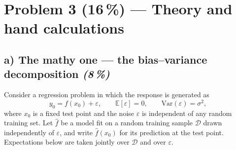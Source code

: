 \documentclass[11pt,a4paper]{article}
\newcommand{\points}[1]{\textbf{(#1\,\%)}}
\newcommand{\subpoints}[1]{\textit{(#1\,\%)}}
\begin{document}
\vfill\eject

\section*{Problem 3 \points{16} --- Theory and hand calculations}

\subsection*{a) The mathy one --- the bias--variance decomposition \subpoints{8}}

Consider a regression problem in which the response is generated as
$$y_0 = f(x_0) + \varepsilon,\qquad \mathbb{E}[\varepsilon] = 0,\qquad \mathrm{Var}(\varepsilon) = \sigma^2,$$
where $x_0$ is a fixed test point and the noise $\varepsilon$ is independent of any random training set. Let $\hat f$ be a model fit on a random training sample $\mathcal{D}$ drawn independently of $\varepsilon$, and write $\hat f(x_0)$ for its prediction at the test point. Expectations below are taken jointly over $\mathcal{D}$ and over $\varepsilon$.
\end{document}
